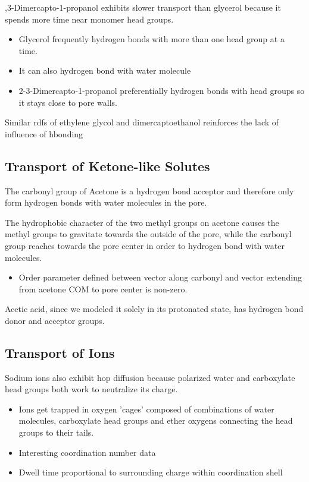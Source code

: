 \documentclass{article}
\begin{document}
  ,3-Dimercapto-1-propanol exhibits slower transport than glycerol because it spends more time
  near monomer head groups. %
  \begin{itemize}
    \item Glycerol frequently hydrogen bonds with more than one head group at a time.
    \item It can also hydrogen bond with water molecule
    \item 2-3-Dimercapto-1-propanol preferentially hydrogen bonds with head groups so it stays
    close to pore walls.
  \end{itemize}
  
  Similar rdfs of ethylene glycol and dimercaptoethanol reinforces the lack of influence of hbonding %
 

  \subsection*{Transport of Ketone-like Solutes}

  The carbonyl group of Acetone is a hydrogen bond acceptor and therefore only
  form hydrogen bonds with water molecules in the pore. 

  The hydrophobic character of the two methyl groups on acetone causes the methyl
  groups to gravitate towards the outside of the pore, while the carbonyl group
  reaches towards the pore center in order to hydrogen bond with water molecules.
  \begin{itemize}
	\item Order parameter defined between vector along carbonyl and vector extending
	from acetone COM to pore center is non-zero.
  \end{itemize} 

  Acetic acid, since we modeled it solely in its protonated state, has hydrogen
  bond donor and acceptor groups. 

  \subsection*{Transport of Ions} %

  Sodium ions also exhibit hop diffusion because polarized water and
  carboxylate head groups both work to neutralize its charge.
  \begin{itemize}
	\item Ions get trapped in oxygen 'cages' composed of combinations
	of water molecules, carboxylate head groups and ether oxygens connecting
	the head groups to their tails.
  	\item Interesting coordination number data
	\item Dwell time proportional to surrounding charge within coordination shell
  \end{itemize}
\end{document}
